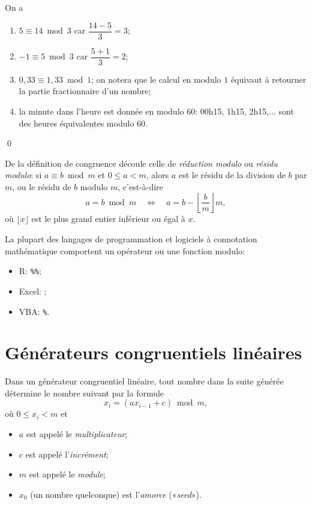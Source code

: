 \begin{exemple}
  On a
  \begin{enumerate}
  \item $5 \equiv 14 \bmod 3$ car $\dfrac{14 - 5}{3} = 3$;
  \item $-1 \equiv 5 \bmod 3$ car $\dfrac{5 + 1}{3} = 2$;
  \item $0,33 \equiv 1,33 \bmod 1$; on notera que le calcul en modulo $1$
    équivaut à retourner la partie fractionnaire d'un nombre;
  \item la minute dans l'heure est donnée en modulo $60$: 00h15, 1h15,
    2h15,... sont des heures équivalentes modulo $60$.
  \end{enumerate}
  \qed
\end{exemple}

De la définition de congruence découle celle de \emph{réduction
  modulo} ou \emph{résidu modulo}: si $a \equiv b \bmod m$ et $0 \leq
a < m$, alors $a$ est le résidu de la division de $b$ par $m$, ou le
résidu de $b$ modulo $m$, c'est-à-dire
\begin{equation*}
  a = b \bmod m
  \quad\Leftrightarrow\quad
  a = b - \left\lfloor \frac{b}{m} \right\rfloor m,
\end{equation*}
où $\lfloor x \rfloor$ est le plus grand entier inférieur ou égal à
$x$.

La plupart des langages de programmation et logiciels à connotation
mathématique comportent un opérateur ou une fonction modulo:
\begin{itemize}
\item R: \verb|%%|;
\item Excel: ;
\item VBA: \verb|%|.
\end{itemize}


\section{Générateurs congruentiels linéaires}
\label{sec:generation:congruentiel}

Dans un générateur congruentiel linéaire, tout nombre dans la suite
générée détermine le nombre suivant par la formule
\begin{equation*}
  x_i = (a x_{i - 1} + c) \bmod m,
\end{equation*}
où $0 \leq x_i < m$ et
\begin{itemize}
\item $a$ est appelé le \emph{multiplicateur};
\item $c$ est appelé l'\emph{incrément};
\item $m$ est appelé le \emph{module};
\item $x_0$ (un nombre quelconque) est l'\emph{amorce} («\emph{seed}»).
\end{itemize}


